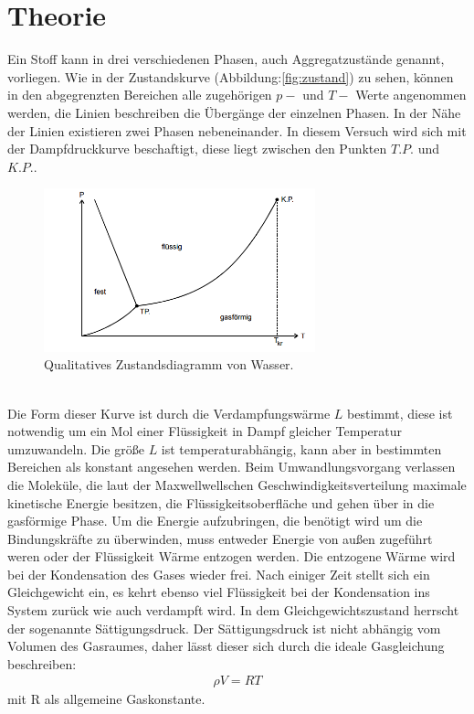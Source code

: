 \section{Theorie}
\label{sec:Theorie}

Ein Stoff kann in drei verschiedenen Phasen, auch Aggregatzustände genannt, vorliegen.
Wie in der Zustandskurve (Abbildung:\ref{fig:zustand}) zu sehen, können in den abgegrenzten
Bereichen alle zugehörigen $p-$ und $T-$ Werte angenommen werden, die Linien
beschreiben die Übergänge der einzelnen Phasen. In der Nähe der Linien existieren zwei
Phasen nebeneinander. In diesem Versuch wird sich mit der Dampfdruckkurve beschaftigt, diese
liegt zwischen den Punkten $T.P.$ und $K.P.$.
\begin{figure}
 \centering
 \includegraphics[width=0.7\textwidth]{zustand.png}
 \caption{Qualitatives Zustandsdiagramm von Wasser.}
 \label{fig:zusatnd}
 \end{figure}\\
 Die Form dieser Kurve ist durch die Verdampfungswärme $L$ bestimmt, diese ist notwendig um
 ein Mol einer Flüssigkeit in Dampf gleicher Temperatur umzuwandeln. Die größe $L$ ist
 temperaturabhängig, kann aber in bestimmten Bereichen als konstant angesehen werden.
 Beim Umwandlungsvorgang verlassen die Moleküle, die laut der Maxwellwellschen
 Geschwindigkeitsverteilung maximale kinetische Energie besitzen, die Flüssigkeitsoberfläche
 und gehen über in die gasförmige Phase. Um die Energie aufzubringen, die benötigt wird um
 die Bindungskräfte zu überwinden, muss entweder Energie von außen zugeführt weren oder
 der Flüssigkeit Wärme entzogen werden. Die entzogene Wärme wird bei der Kondensation des
 Gases wieder frei. Nach einiger Zeit stellt sich ein Gleichgewicht ein, es kehrt ebenso
 viel Flüssigkeit bei der Kondensation ins System zurück wie auch verdampft wird.
 In dem Gleichgewichtszustand herrscht der sogenannte Sättigungsdruck.
 Der Sättigungsdruck ist nicht abhängig vom Volumen des Gasraumes, daher lässt dieser sich durch
 die ideale Gasgleichung beschreiben:
 \begin{align}
 \rho V =RT
 \end{align}
 mit R als allgemeine Gaskonstante.
